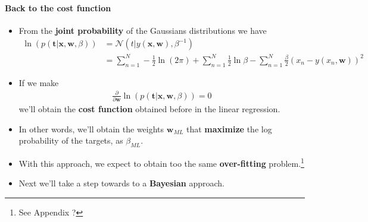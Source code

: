 \begin{frame}{\insertsubsection}
	\framesubtitle{Back to the cost function}
	\begin{itemize}
		\item From the \textcolor{UniOrange}{\textbf{joint probability}} of the Gaussians distributions we have
		\begin{align*}
				\ln \left( p( \mathbf{t}| \mathbf{x}, \mathbf{w}, \beta) \right) 
				&= \mathcal{N} \left( t | y(\mathbf{x}, \mathbf{w}), \beta^{-1} \right) \\
				&= \sum_{n=1}^N - \frac{1}{2} \ln (2 \pi) + \sum_{n=1}^N \frac{1}{2} \ln \beta - \sum_{n=1}^N \frac{\beta}{2} (x_n -  y(x_n, \mathbf{w}))^2
		\end{align*}
		\item If we make
		\begin{align*}
			\frac{\partial}{\partial \mathbf{w}}\ln \left( p( \mathbf{t}| \mathbf{x}, \mathbf{w}, \beta) \right) = 0
		\end{align*}
		we'll obtain the \textcolor{UniOrange}{\textbf{cost function}} obtained before in the linear regression.
		\item In other words, we'll obtain the weights $\mathbf{w}_{ML}$ that \textcolor{UniOrange}{\textbf{maximize}} the log probability of the targets, as $\beta_{ML}$.
		\item With this approach, we expect to obtain too the same \textcolor{UniOrange}{\textbf{over-fitting}} problem.\footnote{See Appendix ?}
		\item Next we'll take a step towards to a \textcolor{UniOrange}{\textbf{Bayesian}} approach.
	\end{itemize}
\end{frame}